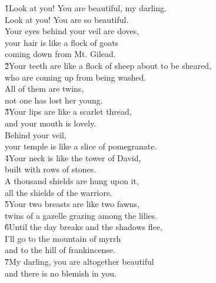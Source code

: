 \begin{poetry}
\poeml {}
\v{1}Look at you! You are beautiful, my darling. \\
\poeml Look at you! You are so beautiful. \\
\poeml Your eyes behind your veil are doves, \\
\poemll    your hair is like a flock of goats \\
\poemlll       coming down from Mt. Gilead. \\
\poeml \v{2}Your teeth are like a flock of sheep about to be sheared, \\
\poemll    who are coming up from being washed. \\
\poeml All of them are twins, \\
\poemll    not one has lost her young. \\
\poeml \v{3}Your lips are like a scarlet thread, \\
\poemll    and your mouth is lovely. \\
\poeml Behind your veil, \\
\poemll    your temple is like a slice of pomegranate. \\
\poeml \v{4}Your neck is like the tower of David, \\
\poemll    built with rows of stones. \\
\poeml A thousand shields are hung upon it, \\
\poemll    all the shields of the warriors. \\
\poeml \v{5}Your two breasts are like two fawns, \\
\poemll    twins of a gazelle grazing among the lilies. \\
\poeml \v{6}Until the day breaks and the shadows flee, \\
\poemll    I'll go to the mountain of myrrh \\
\poemlll       and to the hill of frankincense. \\
\poeml \v{7}My darling, you are altogether beautiful \\
\poemll    and there is no blemish in you. \\

\end{poetry}
